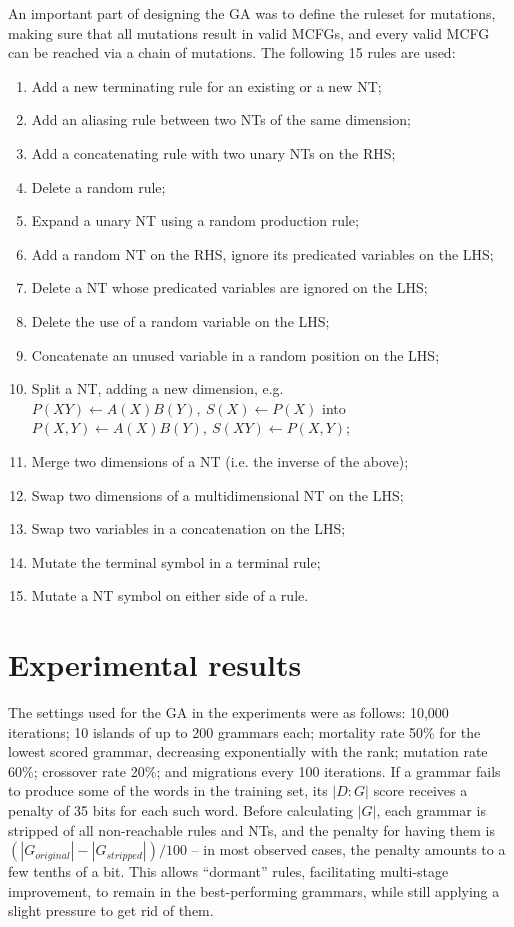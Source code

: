 \documentclass{article}
\begin{document}
An important part of designing the GA was to define the ruleset for mutations, making sure that
all mutations result in valid MCFGs, and every valid MCFG can be reached via a chain of mutations.
The following 15 rules are used:
\begin{enumerate}[itemsep=-2.3pt]
  \item Add a new terminating rule for an existing or a new NT;
  \item Add an aliasing rule between two NTs of the same dimension;
  \item Add a concatenating rule with two unary NTs on the RHS;
  \item Delete a random rule;
  \item Expand a unary NT using a random production rule;
  \item Add a random NT on the RHS, ignore its predicated variables on the LHS;
  \item Delete a NT whose predicated variables are ignored on the LHS;
  \item Delete the use of a random variable on the LHS;
  \item Concatenate an unused variable in a random position on the LHS;
  \item Split a NT, adding a new dimension, e.g. $P(XY) \leftarrow A(X)B(Y),\ S(X) \leftarrow P(X)$ into $P(X, Y) \leftarrow A(X)B(Y),\ S(XY) \leftarrow P(X, Y)$;
  \item Merge two dimensions of a NT (i.e. the inverse of the above);
  \item Swap two dimensions of a multidimensional NT on the LHS;
  \item Swap two variables in a concatenation on the LHS;
  \item Mutate the terminal symbol in a terminal rule;
  \item Mutate a NT symbol on either side of a rule.
\end{enumerate}

\section{Experimental results}
The settings used for the GA in the experiments were as follows: 10,000 iterations;
10 islands of up to 200 grammars each;
mortality rate 50\% for the lowest scored grammar, decreasing exponentially with the rank;
mutation rate 60\%; crossover rate 20\%; and migrations every 100 iterations.
If a grammar fails to produce some of the words in the training set,
its $|D:G|$ score receives a penalty of 35 bits for each such word.
Before calculating $|G|$, each grammar is stripped of all non-reachable rules and NTs,
and the penalty for having them is $(|G_{original}|-|G_{stripped}|)/100$ --
in most observed cases, the penalty amounts to a few tenths of a bit.
This allows ``dormant'' rules, facilitating multi-stage improvement,
to remain in the best-performing grammars, while still applying a slight pressure to get rid of them.
\end{document}
